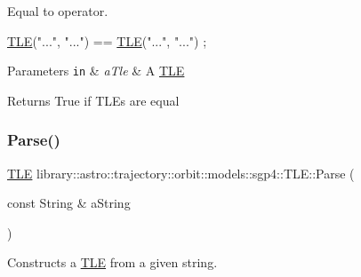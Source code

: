 Equal to operator. 


\begin{DoxyCode}
\hyperlink{classlibrary_1_1astro_1_1trajectory_1_1orbit_1_1models_1_1sgp4_1_1_t_l_e_a4d2b43f02cef44f0c9635daf9946261c}{TLE}(\textcolor{stringliteral}{"..."}, \textcolor{stringliteral}{"..."}) == \hyperlink{classlibrary_1_1astro_1_1trajectory_1_1orbit_1_1models_1_1sgp4_1_1_t_l_e_a4d2b43f02cef44f0c9635daf9946261c}{TLE}(\textcolor{stringliteral}{"..."}, \textcolor{stringliteral}{"..."}) ;
\end{DoxyCode}



\begin{DoxyParams}[1]{Parameters}
\mbox{\tt in}  & {\em a\+Tle} & A \hyperlink{classlibrary_1_1astro_1_1trajectory_1_1orbit_1_1models_1_1sgp4_1_1_t_l_e}{T\+LE} \\
\hline
\end{DoxyParams}
\begin{DoxyReturn}{Returns}
True if T\+L\+Es are equal 
\end{DoxyReturn}
\mbox{\label{classlibrary_1_1astro_1_1trajectory_1_1orbit_1_1models_1_1sgp4_1_1_t_l_e_a842dce63b9adc35c1cb0e21d1777b3a5}} 
\subsubsection{\texorpdfstring{Parse()}{Parse()}}
{\footnotesize\ttfamily \hyperlink{classlibrary_1_1astro_1_1trajectory_1_1orbit_1_1models_1_1sgp4_1_1_t_l_e}{T\+LE} library\+::astro\+::trajectory\+::orbit\+::models\+::sgp4\+::\+T\+L\+E\+::\+Parse (\begin{DoxyParamCaption}\item[{const String \&}]{a\+String }\end{DoxyParamCaption})\hspace{0.3cm}{\ttfamily [static]}}



Constructs a \hyperlink{classlibrary_1_1astro_1_1trajectory_1_1orbit_1_1models_1_1sgp4_1_1_t_l_e}{T\+LE} from a given string. 


